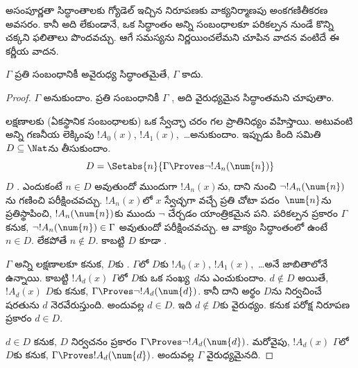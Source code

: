\documentclass[../../../include/open-logic-section]{subfiles}
\begin{document}


అసంపూర్ణతా సిద్ధాంతాలకు గ్యోడెల్ ఇచ్చిన నిరూపణకు వాక్యనిర్మాణపు అంకగణితీకరణ
అవసరం. కానీ అది లేకుండానే, ఒక సిద్ధాంతం అన్ని
 సంబంధాలకూ
 పరికల్పన నుండే కొన్ని చక్కని
ఫలితాలు పొందవచ్చు. ఆగే సమస్యను నిర్ణయించలేమని చూపిన వాదన వంటిదే ఈ కర్ణీయ వాదన.

\begin{thm}
$\Gamma$ ప్రతి  సంబంధానికీ
 అవైరుధ్య సిద్ధాంతమైతే, $\Gamma$
 కాదు.
\end{thm}

\begin{proof}
$\Gamma$  అనుకుందాం. ప్రతి
 సంబంధానికీ $\Gamma$
, అది వైరుధ్యమైన సిద్ధాంతమని చూపుతాం.

 లక్షణాలకు (ఏకస్థానిక సంబంధాలకు) ఒక
స్వేచ్ఛా చరం గల  ప్రాతినిధ్యం వహిస్తాయి. అటువంటి
అన్ని  గణనీయ లెక్కింపు $!A_0(x)$,
$!A_1(x)$,~\dots అనుకుందాం. ఇప్పుడు కింది సమితి~$D\subseteq\Nat$ను తీసుకుందాం.
\[
D = \Setabs{n}{\Gamma \Proves \lnot !A_n(\num{n})}
\]
$D$ . ఎందుకంటే $n\in D$ అవుతుందో
ముందుగా $!A_n(x)$ను, దాని నుంచి $\lnot !A_n(\num{n})$ను గణించి పరీక్షించవచ్చు.
$!A_n(x)$లో $x$ స్వేచ్ఛగా వచ్చే ప్రతి చోటా పదం~$\num{n}$ను ప్రతిస్థాపించి,
$!A_n(\num{n})$కు ముందు $\lnot$ చేర్చడం యాంత్రికమైన పని. పరికల్పన ప్రకారం
$\Gamma$  కనుక,
$\lnot !A_n(\num{n})\in\Gamma$ అవుతుందో పరీక్షించవచ్చు. ఆ వాక్యం సిద్ధాంతంలో
ఉంటే $n\in D$. లేకపోతే $n\notin D$. కాబట్టి $D$ కూడా .

$\Gamma$ అన్ని  లక్షణాలకూ
 కనుక, $D$కు
. $\Gamma$లో $D$కు
 $!A_0(x)$, $!A_1(x)$,~\dots అనే జాబితాలోనే ఉన్నాయి.
కాబట్టి $!A_d(x)$ $\Gamma$లో $D$కు
 ఒక సంఖ్య~$d$ను ఎంచుకుందాం.
$d\notin D$ అయితే, $!A_d(x)$ $D$కు
 కనుక,
$\Gamma\Proves\lnot !A_d(\num{d})$. కానీ దాని అర్థం $D$ను నిర్వచించే షరతును
$d$ నెరవేరుస్తుంది. అందువల్ల $d\in D$. ఇది $d\notin D$కు వైరుధ్యం. కనుక
పరోక్ష నిరూపణ ప్రకారం $d\in D$.

$d\in D$ కనుక, $D$ నిర్వచనం ప్రకారం $\Gamma\Proves\lnot !A_d(\num{d})$.
మరోవైపు, $!A_d(x)$ $\Gamma$లో~$D$కు
 కనుక,
$\Gamma\Proves !A_d(\num{d})$. అందువల్ల $\Gamma$ వైరుధ్యమైనది.
\end{proof}
\end{document}

